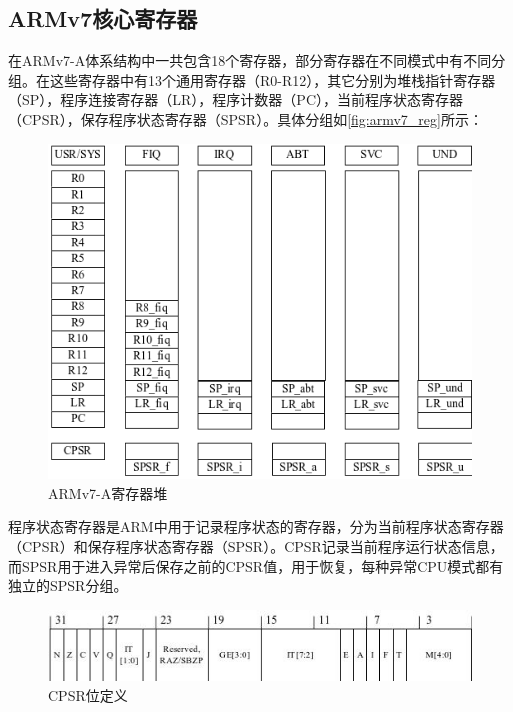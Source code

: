 \documentclass[a4paper, 12pt]{report}
\begin{document}
    \subsection{ARMv7核心寄存器}
    
    在ARMv7-A体系结构中一共包含18个寄存器，部分寄存器在不同模式中有不同分组。在这些寄存器中有13个通用寄存器（R0-R12），其它分别为堆栈指针寄存器（SP），程序连接寄存器（LR），程序计数器（PC），当前程序状态寄存器（CPSR），保存程序状态寄存器（SPSR）。具体分组如\autoref{fig:armv7_reg}所示：
    
    \begin{figure}[htbp]
        \centering
        \includegraphics{./image/armv7_reg.png}
        \caption{ARMv7-A寄存器堆}
        \label{fig:armv7_reg}
    \end{figure}
    
    程序状态寄存器是ARM中用于记录程序状态的寄存器，分为当前程序状态寄存器（CPSR）和保存程序状态寄存器（SPSR）。CPSR记录当前程序运行状态信息，而SPSR用于进入异常后保存之前的CPSR值，用于恢复，每种异常CPU模式都有独立的SPSR分组。
    
    \begin{figure}[htbp]
        \centering
        \includegraphics{./image/armv7_cpsr.jpg}
        \caption{CPSR位定义}
        \label{fig:armv7_cpsr}
    \end{figure}
    
\end{document}
